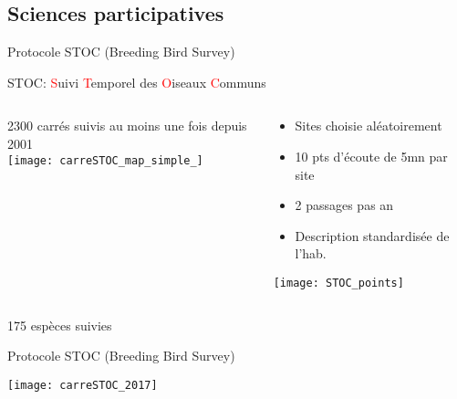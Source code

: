 \documentclass[10pt]{beamer}
\begin{document}
\subsection{Sciences participatives} 

\begin{frame}{Protocole STOC (Breeding Bird Survey)}
    \begin{center}
      STOC: \textcolor{red}{S}uivi \textcolor{red}{T}emporel des \textcolor{red}{O}iseaux \textcolor{red}{C}ommuns
  \end{center}
 \begin{columns}[c]
    \begin{column}[c]{0.5\textwidth}
      \begin{center}
      2300 carrés suivis au moins une fois depuis 2001 \\
    \texttt{[image: carreSTOC\_map\_simple\_]}
      \end{center}
    \end{column}
    \begin{column}[c]{0.5\textwidth}
    \begin{small}
      \begin{itemize}
      \item  Sites choisie aléatoirement
    \item 10 pts d'écoute de 5mn par site
    \item 2 passages pas an
    \item Description standardisée de l'hab.
    \end{itemize}
    \end{small}
     \begin{center}
       \texttt{[image: STOC\_points]}
  \end{center}
    \end{column}
  \end{columns}
 \begin{center}
  175 espèces suivies
  \end{center}
\end{frame}


\begin{frame}{Protocole STOC (Breeding Bird Survey)}
    \begin{center}
        \texttt{[image: carreSTOC\_2017]}
  \end{center}
 
\end{frame}
\end{document}
